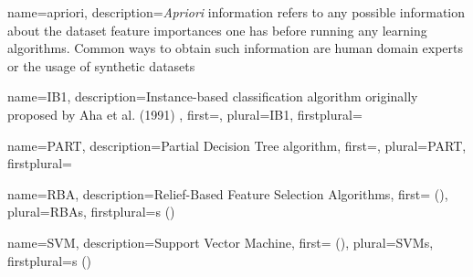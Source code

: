 

\makenoidxglossaries
{}

{
    name={apriori},
    description={\textit{Apriori} information refers to any possible information about the dataset feature importances one has before running any learning algorithms. Common ways to obtain such information are human domain experts or the usage of synthetic datasets}
}

{
  name={IB1},
  description={Instance-based classification algorithm originally proposed by Aha et al. (1991) \citep{aha_instance-based_1991}},
  first={},
  plural={IB1},
  firstplural={}
}

{
  name={PART},
  description={Partial Decision Tree algorithm},
  first={},
  plural={PART},
  firstplural={}
}

{
  name={RBA},
  description={Relief-Based Feature Selection Algorithms},
  first={ ()},
  plural={RBAs},
  firstplural={s ()}
}

{
  name={SVM},
  description={Support Vector Machine},
  first={ ()},
  plural={SVMs},
  firstplural={s ()}
}
